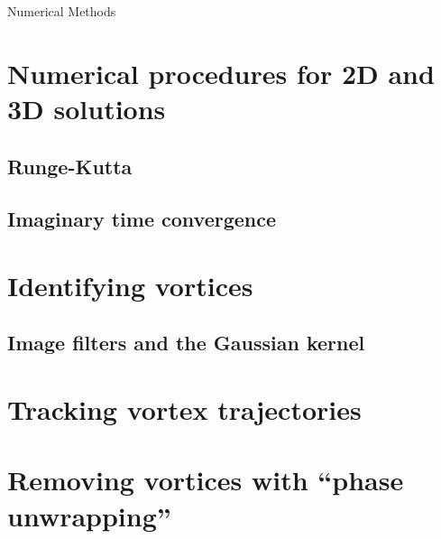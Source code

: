 \begin{chapter}{\label{cha:numerics}Numerical Methods}
\section{\label{section:RK} Numerical procedures for 2D and 3D solutions}
	\subsection{\label{section:RK4} Runge-Kutta}
	\subsection{\label{section:imagTime} Imaginary time convergence}
\section{\label{section:vortexidentifying} Identifying vortices}
	\subsection{\label{section:gaussianblur} Image filters and the Gaussian kernel}
\section{\label{section:vortextracking} Tracking vortex trajectories}
\section{\label{section:vortexremoval} Removing vortices with ``phase unwrapping''}
\end{chapter}